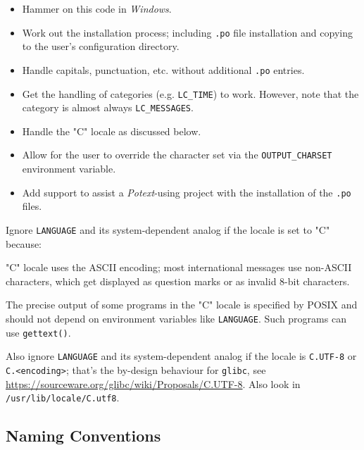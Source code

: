 \documentclass[
 11pt,
 twoside,
 a4paper,
 final                                 %
]{article}
\begin{document}
   \begin{itemize}
      \item Hammer on this code in \textsl{Windows}.
      \item Work out the installation process; including \texttt{.po} file
         installation and copying to the user's configuration directory.
      \item Handle capitals, punctuation, etc. without additional
         \texttt{.po} entries.
      \item Get the handling of categories (e.g. \texttt{LC\_TIME}) to
         work. However, note that the category is almost always
         \texttt{LC\_MESSAGES}.
      \item Handle the "C" locale as discussed below.
      \item Allow for the user to override the character set via the
         \texttt{OUTPUT\_CHARSET} environment variable.
      \item Add support to assist a \textsl{Potext}-using project with the
         installation of the \texttt{.po} files.
   \end{itemize}

   Ignore \texttt{LANGUAGE} and its system-dependent analog if the locale is
   set to "C" because:

   \begin{enumber}
      \item "C" locale uses the ASCII encoding; most international
         messages use non-ASCII characters, which get displayed
         as question marks or as invalid 8-bit characters.
      \item The precise output of some programs in the "C" locale
         is specified by POSIX and should not depend on environment
         variables like \texttt{LANGUAGE}.  Such programs can use
         \texttt{gettext()}.
   \end{enumber}

   Also ignore \texttt{LANGUAGE} and its system-dependent analog if the
   locale is \texttt{C.UTF-8} or \texttt{C.<encoding>}; that's
   the by-design behaviour for \texttt{glibc}, see
   \url{https://sourceware.org/glibc/wiki/Proposals/C.UTF-8}.
   Also look in \texttt{/usr/lib/locale/C.utf8}.

\subsection{Naming Conventions}
\label{subsec:introduction_conventions}
\end{document}
